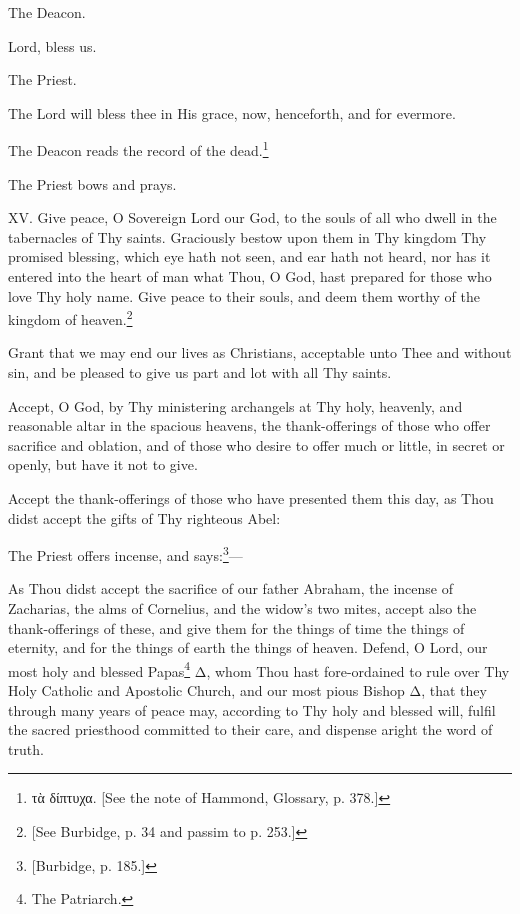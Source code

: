 The Deacon.

Lord, bless us.

The Priest.

The Lord will bless thee in His grace, now, henceforth, and for evermore.

The Deacon reads the record of the dead.\footnote{\par  \textgreek{τὰ δίπτυχα}. [See the note of Hammond, Glossary, p. 378.]}

The Priest bows and prays.

XV. Give peace, O Sovereign Lord our God, to the souls of all who dwell in the tabernacles of Thy saints. Graciously bestow upon them in Thy kingdom Thy promised blessing, which eye hath not seen, and ear hath not heard, nor has it entered into the heart of man what Thou, O God, hast prepared for those who love Thy holy name. Give peace to their souls, and deem them worthy of the kingdom of heaven.\footnote{\par{}  [See Burbidge, p. 34 and passim to p. 253.]}

Grant that we may end our lives as Christians, acceptable unto Thee and without sin, and be pleased to give us part and lot with all Thy saints.

Accept, O God, by Thy ministering archangels at Thy holy, heavenly, and reasonable altar in the spacious heavens, the thank-offerings of those who offer sacrifice and oblation, and of those who desire to offer much or little, in secret or openly, but have it not to give.

Accept the thank-offerings of those who have presented them this day, as Thou didst accept the gifts of Thy righteous Abel:

The Priest offers incense, and says:\footnote{\par{}  [Burbidge, p. 185.]}—

As Thou didst accept the sacrifice of our father Abraham, the incense of Zacharias, the alms of Cornelius, and the widow’s two mites, accept also the thank-offerings of these, and give them for the things of time the things of eternity, and for the things of earth the things of heaven. Defend, O Lord, our most holy and blessed Papas\footnote{\par  The Patriarch.} Δ, whom Thou hast fore-ordained to rule over Thy Holy Catholic and Apostolic Church, and our most pious Bishop Δ, that they through many years of peace may, according to Thy holy and blessed will, fulfil the sacred priesthood committed to their care, and dispense aright the word of truth.

